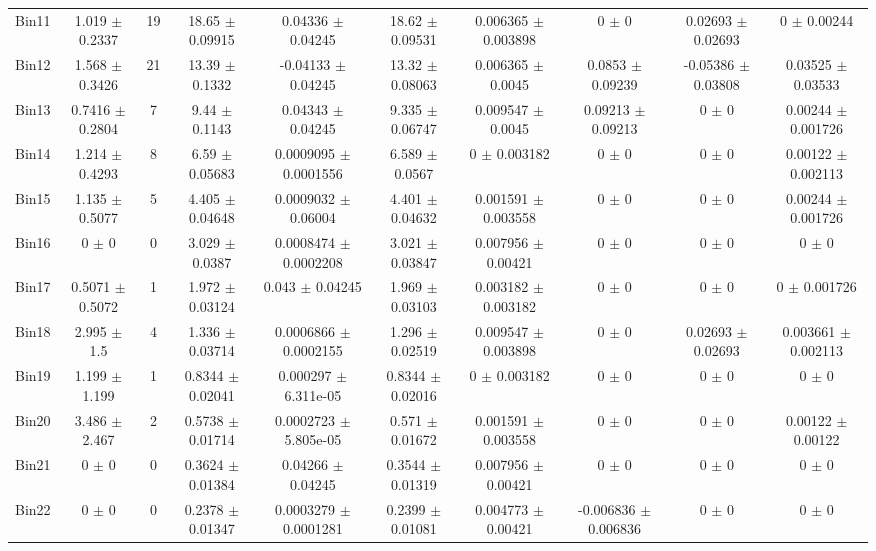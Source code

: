 \begin{tabular}{@{\extracolsep{4pt}}lccccccccc@{}}
     Bin11 & 1.019 $\pm$ 0.2337 & 19 & 18.65 $\pm$ 0.09915 & 0.04336 $\pm$ 0.04245 & 18.62 $\pm$ 0.09531 & 0.006365 $\pm$ 0.003898 & 0 $\pm$ 0 & 0.02693 $\pm$ 0.02693 & 0 $\pm$ 0.00244 \\ 
     Bin12 & 1.568 $\pm$ 0.3426 & 21 & 13.39 $\pm$ 0.1332 & -0.04133 $\pm$ 0.04245 & 13.32 $\pm$ 0.08063 & 0.006365 $\pm$ 0.0045 & 0.0853 $\pm$ 0.09239 & -0.05386 $\pm$ 0.03808 & 0.03525 $\pm$ 0.03533 \\ 
     Bin13 & 0.7416 $\pm$ 0.2804 & 7 & 9.44 $\pm$ 0.1143 & 0.04343 $\pm$ 0.04245 & 9.335 $\pm$ 0.06747 & 0.009547 $\pm$ 0.0045 & 0.09213 $\pm$ 0.09213 & 0 $\pm$ 0 & 0.00244 $\pm$ 0.001726 \\ 
     Bin14 & 1.214 $\pm$ 0.4293 & 8 & 6.59 $\pm$ 0.05683 & 0.0009095 $\pm$ 0.0001556 & 6.589 $\pm$ 0.0567 & 0 $\pm$ 0.003182 & 0 $\pm$ 0 & 0 $\pm$ 0 & 0.00122 $\pm$ 0.002113 \\ 
     Bin15 & 1.135 $\pm$ 0.5077 & 5 & 4.405 $\pm$ 0.04648 & 0.0009032 $\pm$ 0.06004 & 4.401 $\pm$ 0.04632 & 0.001591 $\pm$ 0.003558 & 0 $\pm$ 0 & 0 $\pm$ 0 & 0.00244 $\pm$ 0.001726 \\ 
     Bin16 & 0 $\pm$ 0 & 0 & 3.029 $\pm$ 0.0387 & 0.0008474 $\pm$ 0.0002208 & 3.021 $\pm$ 0.03847 & 0.007956 $\pm$ 0.00421 & 0 $\pm$ 0 & 0 $\pm$ 0 & 0 $\pm$ 0 \\ 
     Bin17 & 0.5071 $\pm$ 0.5072 & 1 & 1.972 $\pm$ 0.03124 & 0.043 $\pm$ 0.04245 & 1.969 $\pm$ 0.03103 & 0.003182 $\pm$ 0.003182 & 0 $\pm$ 0 & 0 $\pm$ 0 & 0 $\pm$ 0.001726 \\ 
     Bin18 & 2.995 $\pm$ 1.5 & 4 & 1.336 $\pm$ 0.03714 & 0.0006866 $\pm$ 0.0002155 & 1.296 $\pm$ 0.02519 & 0.009547 $\pm$ 0.003898 & 0 $\pm$ 0 & 0.02693 $\pm$ 0.02693 & 0.003661 $\pm$ 0.002113 \\ 
     Bin19 & 1.199 $\pm$ 1.199 & 1 & 0.8344 $\pm$ 0.02041 & 0.000297 $\pm$ 6.311e-05 & 0.8344 $\pm$ 0.02016 & 0 $\pm$ 0.003182 & 0 $\pm$ 0 & 0 $\pm$ 0 & 0 $\pm$ 0 \\ 
     Bin20 & 3.486 $\pm$ 2.467 & 2 & 0.5738 $\pm$ 0.01714 & 0.0002723 $\pm$ 5.805e-05 & 0.571 $\pm$ 0.01672 & 0.001591 $\pm$ 0.003558 & 0 $\pm$ 0 & 0 $\pm$ 0 & 0.00122 $\pm$ 0.00122 \\ 
     Bin21 & 0 $\pm$ 0 & 0 & 0.3624 $\pm$ 0.01384 & 0.04266 $\pm$ 0.04245 & 0.3544 $\pm$ 0.01319 & 0.007956 $\pm$ 0.00421 & 0 $\pm$ 0 & 0 $\pm$ 0 & 0 $\pm$ 0 \\ 
     Bin22 & 0 $\pm$ 0 & 0 & 0.2378 $\pm$ 0.01347 & 0.0003279 $\pm$ 0.0001281 & 0.2399 $\pm$ 0.01081 & 0.004773 $\pm$ 0.00421 & -0.006836 $\pm$ 0.006836 & 0 $\pm$ 0 & 0 $\pm$ 0 \\ 

\end{tabular}
